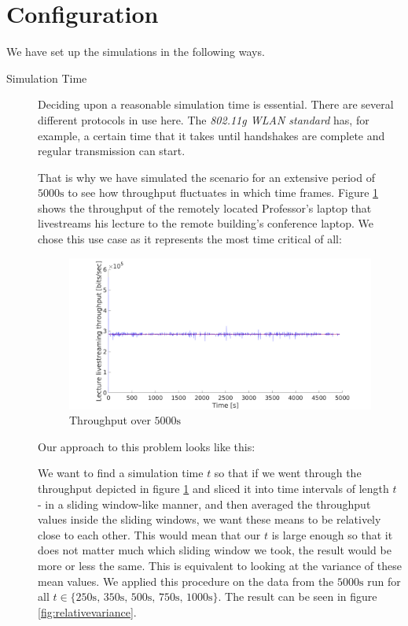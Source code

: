 \documentclass[a4paper]{scrreprt}
\begin{document}
	\section{Configuration}
		We have set up the simulations in the following ways.
		\begin{description}
			\item[Simulation Time] Deciding upon a reasonable simulation time is essential. There are several different protocols in use here. The \emph{802.11g WLAN standard} has, for example, a certain time that it takes until handshakes are complete and regular transmission can start.			
			
			That is why we have simulated the scenario for an extensive period of $5000\text{s}$ to see how throughput fluctuates in which time frames. Figure \ref{fig:5000s} shows the throughput of the remotely located Professor's laptop that livestreams his lecture to the remote building's conference laptop. We chose this use case as it represents the most time critical of all:
			
			\begin{figure}[H]
				\center\includegraphics[width=\textwidth]{../Get_Simulation_Parameters/long_simulation_5000sec.png}
				\caption{Throughput over $5000\text{s}$}
				\label{fig:5000s}
			\end{figure}
			
			Our approach to this problem looks like this:
			
			We want to find a simulation time $t$ so that if we went through the throughput depicted in figure \ref{fig:5000s} and sliced it into time intervals of length $t$ - in a sliding window-like manner, and then averaged the throughput values inside the sliding windows, we want these means to be relatively close to each other. This would mean that our $t$ is large enough so that it does not matter much which sliding window we took, the result would be more or less the same. This is equivalent to looking at the variance of these mean values. We applied this procedure on the data from the $5000\text{s}$ run for all $t\in\{250\text{s},\, 350\text{s},\, 500\text{s},\, 750\text{s},\, 1000\text{s}\}$. The result can be seen in figure \ref{fig:relativevariance}.
			

\end{description}
\end{document}
